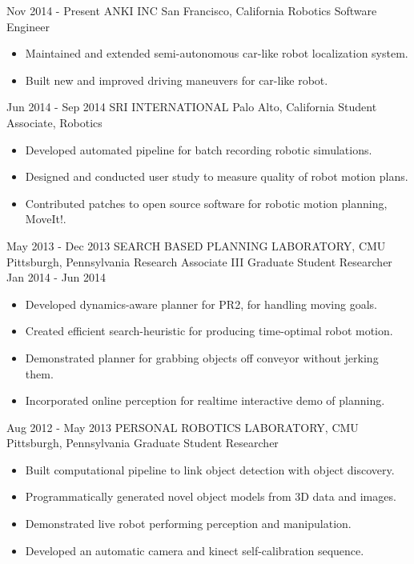 \documentclass[]{friggeri-cv} %
\begin{document}
\begin{entrylist}
\jobentry
{Nov 2014 - Present}
{ANKI INC}
{San Francisco, California}
{Robotics Software Engineer}
{\begin{itemize}
\item Maintained and extended semi-autonomous car-like robot localization system.
\item Built new and improved driving maneuvers for car-like robot.
\end{itemize}}
\jobentry
{Jun 2014 - Sep 2014}
{SRI INTERNATIONAL}
{Palo Alto, California}
{Student Associate, Robotics}
{\begin{itemize}
\item Developed automated pipeline for batch recording robotic simulations.
\item Designed and conducted user study to measure quality of robot motion plans.
\item Contributed patches to open source software for robotic motion planning, MoveIt!.
\end{itemize}}
\jjobentry
{May 2013 - Dec 2013}
{SEARCH BASED PLANNING LABORATORY, CMU}
{Pittsburgh, Pennsylvania}
{Research Associate III}
{Graduate Student Researcher}
{Jan 2014 - Jun 2014}
{\begin{itemize}\item Developed dynamics-aware planner for PR2, for handling moving goals.
\item Created efficient search-heuristic for producing time-optimal robot motion.
\item Demonstrated planner for grabbing objects off conveyor without jerking them.
\item Incorporated online perception for realtime interactive demo of planning.
\end{itemize}}
\jobentry
{Aug 2012 - May 2013}
{PERSONAL ROBOTICS LABORATORY, CMU}
{Pittsburgh, Pennsylvania}
{Graduate Student Researcher}
{\begin{itemize}\item Built computational pipeline to link object detection with object discovery.
\item Programmatically generated novel object models from 3D data and images.
\item Demonstrated live robot performing perception and manipulation.
\item Developed an automatic camera and kinect self-calibration sequence.

\end{itemize}}
\end{entrylist}
\end{document}
